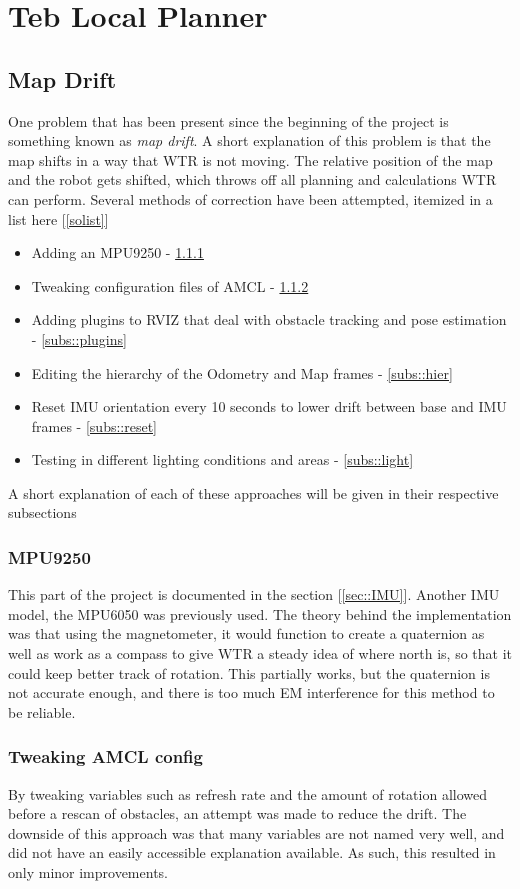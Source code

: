 \section{Teb Local Planner}


\subsection{Map Drift}
One problem that has been present since the beginning of the project is something known as \textit{map drift}.
A short explanation of this problem is that the map shifts in a way that WTR is not moving.
The relative position of the map and the robot gets shifted, which throws off all planning and calculations WTR can perform.
Several methods of correction have been attempted, itemized in a list here [\ref{solist}]
\begin{itemize}
\label{solist}
\item Adding an MPU9250 - \ref{subs::mpu}
\item Tweaking configuration files of AMCL - \ref{subs::AMCL}
\item Adding plugins to RVIZ that deal with obstacle tracking and pose estimation - \ref{subs::plugins}
\item Editing the hierarchy of the Odometry and Map frames - \ref{subs::hier}
\item Reset IMU orientation every 10 seconds to lower drift between base and IMU frames - \ref{subs::reset}
\item Testing in different lighting conditions and areas - \ref{subs::light}
\end{itemize}
A short explanation of each of these approaches will be given in their respective subsections

\subsubsection{MPU9250}
\label{subs::mpu}
This part of the project is documented in the section [\ref{sec::IMU}].
Another IMU model, the MPU6050 was previously used.
The theory behind the implementation was that using the magnetometer, it would function to create a quaternion as well as work as a compass to give WTR a steady idea of where north is, so that it could keep better track of rotation.
This partially works, but the quaternion is not accurate enough, and there is too much EM interference for this method to be reliable.

\subsubsection{Tweaking AMCL config}
\label{subs::AMCL}
By tweaking variables such as refresh rate and the amount of rotation allowed before a rescan of obstacles, an attempt was made to reduce the drift.
The downside of this approach was that many variables are not named very well, and did not have an easily accessible explanation available.
As such, this resulted in only minor improvements.

